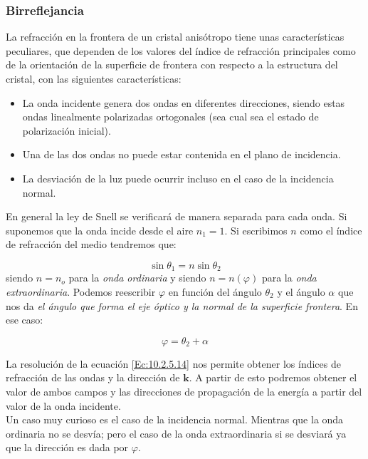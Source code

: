 \documentclass[12pt,a4paper]{article}
\newcommand{\kn}{\mathbf{k}}
\numberwithin{equation}{section}
\numberwithin{figure}{section}
\begin{document}
\subsubsection{Birreflejancia}


La refracción en la frontera de un cristal anisótropo tiene unas características peculiares, que dependen de los valores del índice de refracción principales como de la orientación de la superficie de frontera con respecto a la estructura del cristal, con las siguientes características:

\begin{itemize}
\item La onda incidente genera dos ondas en diferentes direcciones, siendo estas ondas linealmente polarizadas ortogonales (sea cual sea el estado de polarización inicial).

\item Una de las dos ondas no puede estar contenida en el plano de incidencia.
\item La desviación de la luz puede ocurrir incluso en el caso de la incidencia normal.
\end{itemize}

En general la ley de Snell se verificará de manera separada para cada onda. Si suponemos que la onda incide desde el aire $n_1=1$. Si escribimos $n$ como el índice de refracción del medio tendremos que:

\begin{equation}
\sin \theta_1 = n \sin \theta_2 \label{Ec:10.2.5.14}
\end{equation}
siendo $n=n_o$ para la \textit{onda ordinaria} y siendo $n=n(\varphi)$ para la \textit{onda extraordinaria}. Podemos reescribir $\varphi$ en función del ángulo $\theta_2$ y el ángulo $\alpha$ que nos da \textit{el ángulo que forma el eje óptico y la normal de la superficie frontera}. En ese caso:

\begin{equation}
\varphi = \theta_2 + \alpha
\end{equation}

La resolución de la ecuación \ref{Ec:10.2.5.14} nos permite obtener los índices de refracción de las ondas y la dirección de $\kn$. A partir de esto podremos obtener el valor de ambos campos y las direcciones de propagación de la energía a partir del valor de la onda incidente. \\

Un caso muy curioso es el caso de la incidencia normal. Mientras que la onda ordinaria no se desvía; pero el caso de la onda extraordinaria si se desviará ya que la dirección es dada por $\varphi$. 
\end{document}

